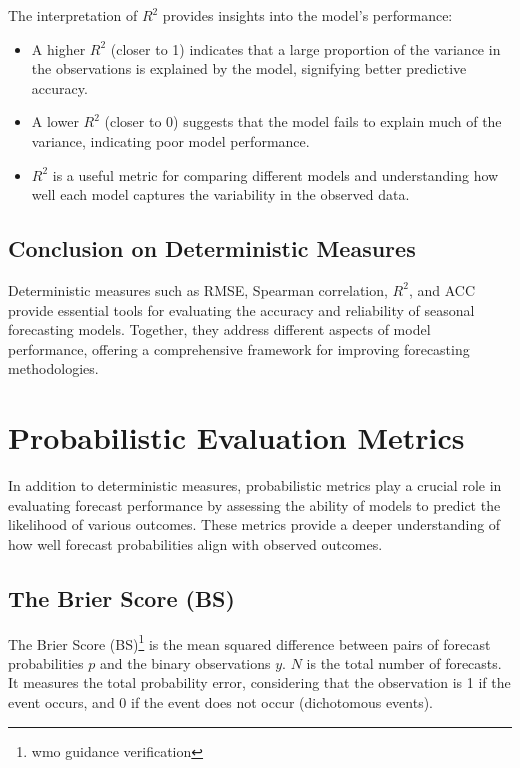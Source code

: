 The interpretation of \( R^2 \) provides insights into the model's performance:  
\begin{itemize}
    \item A higher \( R^2 \) (closer to 1) indicates that a large proportion of the variance in the observations is explained by the model, signifying better predictive accuracy.  
    \item A lower \( R^2 \) (closer to 0) suggests that the model fails to explain much of the variance, indicating poor model performance.  
    \item \( R^2 \) is a useful metric for comparing different models and understanding how well each model captures the variability in the observed data.  
\end{itemize}




\subsection{Conclusion on Deterministic Measures}

Deterministic measures such as RMSE, Spearman correlation, \( R^2 \), and ACC provide essential tools for evaluating the accuracy and reliability of seasonal forecasting models. Together, they address different aspects of model performance, offering a comprehensive framework for improving forecasting methodologies.



\section{Probabilistic Evaluation Metrics}
In addition to deterministic measures, probabilistic metrics play a crucial role in evaluating forecast performance by assessing the ability of models to predict the likelihood of various outcomes. These metrics provide a deeper understanding of how well forecast probabilities align with observed outcomes.

\subsection{The Brier Score (BS)}
The Brier Score (BS)\footnote{wmo guidance verification} is the mean squared difference between pairs of forecast probabilities \( p \) and the binary observations \( y \). \( N \) is the total number of forecasts. It measures the total probability error, considering that the observation is 1 if the event occurs, and 0 if the event does not occur (dichotomous events).

